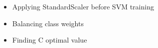 \begin{itemize}
	\item Applying StandardScaler before SVM training
	\item Balancing class weights
	\item Finding C optimal value
\end{itemize}